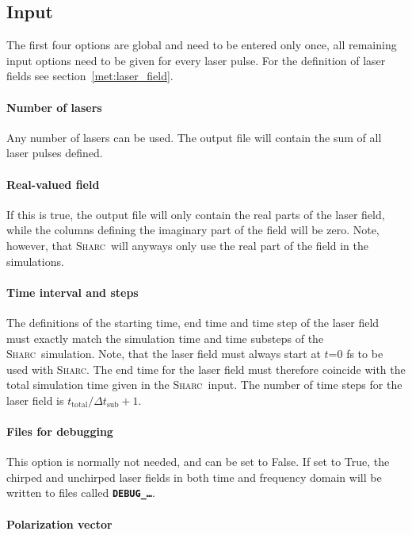\documentclass[a4paper,10pt,DIV=15,openany]{scrbook}
\newcommand{\sharc}{\textsc{Sharc}}
\newcommand{\ttt}[1]{\textbf{\texttt{#1}}}
\begin{document}
\subsection{Input}

The first four options are global and need to be entered only once, all remaining input options need to be given for every laser pulse. For the definition of laser fields see section~\ref{met:laser_field}.

\paragraph{Number of lasers}

Any number of lasers can be used. The output file will contain the sum of all laser pulses defined.

\paragraph{Real-valued field}

If this is true, the output file will only contain the real parts of the laser field, while the columns defining the imaginary part of the field will be zero. Note, however, that \sharc\ will anyways only use the real part of the field in the simulations.

\paragraph{Time interval and steps}

The definitions of the starting time, end time and time step of the laser field must exactly match the simulation time and time substeps of the \sharc\ simulation. Note, that the laser field must always start at $t$=0 fs to be used with \sharc. The end time for the laser field must therefore coincide with the total simulation time given in the \sharc\ input. The number of time steps for the laser field is $t_\text{total}/\Delta t_\text{sub} +1$.

\paragraph{Files for debugging}

This option is normally not needed, and can be set to False. If set to True, the chirped and unchirped laser fields in both time and frequency domain will be written to files called \ttt{DEBUG\_\dots}.

\paragraph{Polarization vector}
\end{document}
